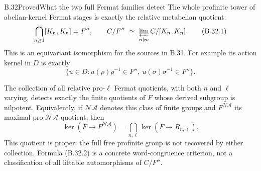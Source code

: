\begin{statement}{B.32}{Proved}{What the two full Fermat families detect}
The whole profinite tower of abelian-kernel Fermat stages is
exactly the relative metabelian quotient:
\[
       \bigcap_{n\ge1}[K_n,K_n]=F'',\qquad
       C/F''\ \simeq\ \varprojlim_{n\mid m} C/[K_n,K_n].
                                                        \tag{B.32.1}
\]
This is an equivariant isomorphism for the sources in B.31.
For example its action kernel in $D$ is exactly
\[
 \{u\in D:u(\rho)\rho^{-1}\in F'',\
                     u(\sigma)\sigma^{-1}\in F''\}.
                                                        \tag{B.32.2}
\]

The collection of all relative pro-$\ell$ Fermat quotients,
with both $n$ and $\ell$ varying, detects exactly the finite
quotients of $F$ whose derived subgroup is nilpotent.
Equivalently, if $\mathcal N\mathcal A$ denotes this class
of finite groups and $F^{\mathcal N\mathcal A}$ its maximal
pro-$\mathcal N\mathcal A$ quotient, then
\[
 \ker(F\to F^{\mathcal N\mathcal A})
       =\bigcap_{n,\ell}\ker(F\to R_{n,\ell}).
                                                        \tag{B.32.3}
\]
This quotient is proper: the full free profinite group is
not recovered by either collection. Formula (B.32.2)
is a concrete word-congruence criterion, not a classification
of all liftable automorphisms of $C/F''$.
\end{statement}

